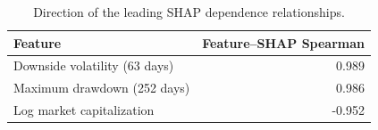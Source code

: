 \begin{table}
\caption{Direction of the leading SHAP dependence relationships.}
\label{tab:xgboost-shap-direction}
\begin{tabular}{lr}
\toprule
Feature & Feature--SHAP Spearman \\
\midrule
Downside volatility (63 days) & 0.989 \\
Maximum drawdown (252 days) & 0.986 \\
Log market capitalization & -0.952 \\
\bottomrule
\end{tabular}
\end{table}
